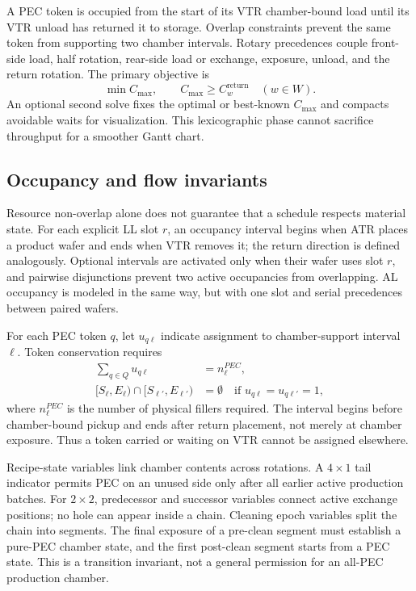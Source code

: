 \documentclass{ifacconf}
\begin{document}
A PEC token is occupied from the start of its VTR chamber-bound load until its VTR unload has returned it to storage. Overlap constraints prevent the same token from supporting two chamber intervals. Rotary precedences couple front-side load, half rotation, rear-side load or exchange, exposure, unload, and the return rotation. The primary objective is
\begin{equation}
 \min C_{\max},\qquad C_{\max}\ge C^{\mathrm{return}}_w\quad(w\in W).
 \label{eq:makespan}
\end{equation}
An optional second solve fixes the optimal or best-known $C_{\max}$ and compacts avoidable waits for visualization. This lexicographic phase cannot sacrifice throughput for a smoother Gantt chart.

\subsection{Occupancy and flow invariants}

Resource non-overlap alone does not guarantee that a schedule respects material state. For each explicit LL slot $r$, an occupancy interval begins when ATR places a product wafer and ends when VTR removes it; the return direction is defined analogously. Optional intervals are activated only when their wafer uses slot $r$, and pairwise disjunctions prevent two active occupancies from overlapping. AL occupancy is modeled in the same way, but with one slot and serial precedences between paired wafers.

For each PEC token $q$, let $u_{q\ell}$ indicate assignment to chamber-support interval $\ell$. Token conservation requires
\begin{equation}
\begin{aligned}
 \sum_{q\in Q}u_{q\ell}&=n^{PEC}_{\ell},\\
 [S_{\ell},E_{\ell})\cap[S_{\ell'},E_{\ell'})&=\emptyset
 \quad\text{if }u_{q\ell}=u_{q\ell'}=1,
\end{aligned}
\label{eq:pec}
\end{equation}
where $n^{PEC}_{\ell}$ is the number of physical fillers required. The interval begins before chamber-bound pickup and ends after return placement, not merely at chamber exposure. Thus a token carried or waiting on VTR cannot be assigned elsewhere.

Recipe-state variables link chamber contents across rotations. A $4\times1$ tail indicator permits PEC on an unused side only after all earlier active production batches. For $2\times2$, predecessor and successor variables connect active exchange positions; no hole can appear inside a chain. Cleaning epoch variables split the chain into segments. The final exposure of a pre-clean segment must establish a pure-PEC chamber state, and the first post-clean segment starts from a PEC state. This is a transition invariant, not a general permission for an all-PEC production chamber.
\end{document}
